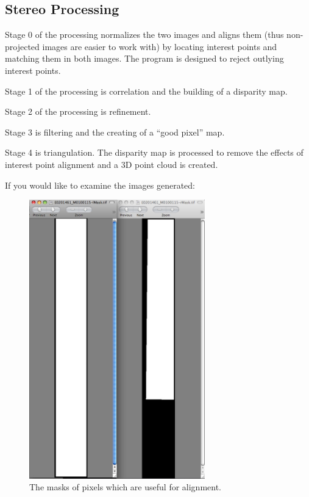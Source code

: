 \subsection*{Stereo Processing}

Stage 0 of the processing normalizes the two images and aligns them
(thus non-projected images are easier to work with) by locating
interest points and matching them in both images. The program is
designed to reject outlying interest points.

Stage 1 of the processing is correlation and the building of a disparity map. 

Stage 2 of the processing is refinement. 

Stage 3 is filtering and the creating of a ``good pixel'' map. 

Stage 4 is triangulation. The disparity map is processed to remove
the effects of interest point alignment and a 3D point cloud is
created.

If you would like to examine the images generated:

\begin{figure}
\begin{center}
\includegraphics[width=3in]{images/p19-masks.png}
\caption[P19 images masks]{
    \label{p19-masks}
	The masks of pixels which are useful for alignment.
    }
\end{center}
\end{figure}

